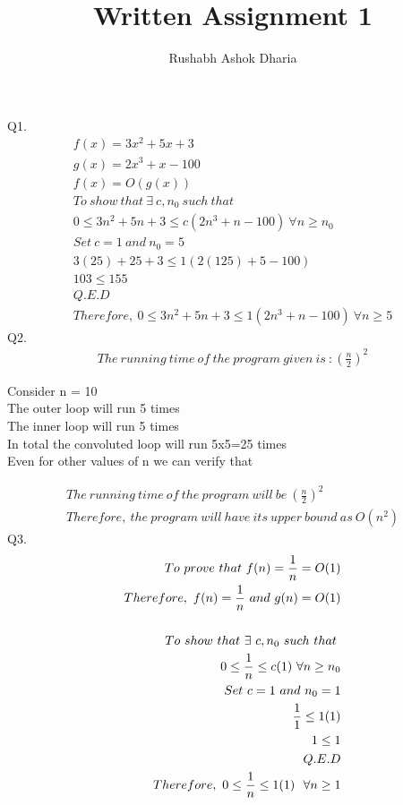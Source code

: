 \documentclass{article}
\title{Written Assignment 1}
\author{Rushabh Ashok Dharia}
\begin{document}
\maketitle
Q1.
\begin{align*}
f(x) = 3x^2+5x+3 \\
g(x) = 2x^3+x-100 \\
f(x) = O(g(x)) \\
To~{} show~{} that~{} \exists~{} c,n_0~{}	such~{} that~{}\\
0 \leq 3n^2+5n+3 \leq c(2n^3+n-100)~{} \forall n\geq n_0\\ 
Set~{} c=1~{} and~{} n_0 = 5 \\
3(25)+25+3 \leq 1(2(125)+5-100) \\
103\leq155 \\
Q.E.D  \\
Therefore,~{} 0 \leq 3n^2+5n+3 \leq 1(2n^3+n-100)~{} \forall n\geq 5
\end{align*}	 
Q2.
\begin{align*}
The~{} running~{} time~{} of~{} the~{} program~{} given~{} is~{}:
(\frac{n}{2})^2
\end{align*}
\begin{description}
	Consider n = 10\\
	The outer loop will run 5 times\\
	The inner loop will run 5 times\\
	In total the convoluted loop will run 5x5=25 times\\
Even for other values of n we can verify that  
\end{description}
\begin{align*}
The~{} running~{} time~{} of~{} the~{} program~{} will~{} be~{}
(\frac{n}{2})^2\\
Therefore,~{} the~{} program~{} will~{} have~{} its~{} upper~{} bound~{} as~{} O(n^2)
\end{align*}
Q3.
\begin{align*}
To~{} prove~{} that~{}f(n) = \frac{1}{n} = O(1) \\
Therefore,~{}f(n) = \frac{1}{n}~{} and~{}
g(n) = O(1) \\
\\
To~{} show~{} that~{} \exists~{} c,n_0~{}	such~{} that~{}\notag\\
0 \leq \frac{1}{n} \leq c(1)~{} \forall n\geq n_0\\ 
Set~{} c=1~{} and~{} n_0 = 1 \\
\frac{1}{1} \leq 1(1) \\
1\leq1\notag\\
Q.E.D \notag \\
Therefore,~{} 0 \leq \frac{1}{n} \leq 1(1)~{} ~{} \forall n\geq 1
\end{align*}
\end{document}
